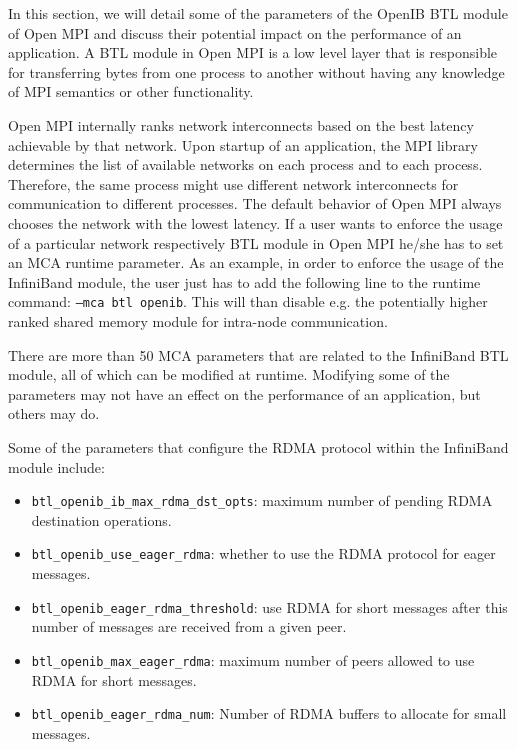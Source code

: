 In this section, we will detail some of the parameters of the OpenIB BTL module of Open MPI and discuss their potential impact on the performance of an application.  A BTL module in Open MPI is a low level layer that is responsible for transferring bytes from one process to another without having any knowledge of MPI semantics or other functionality. 

Open MPI internally ranks network interconnects based on the best latency achievable by that network. Upon startup of an application, the MPI library determines the list of available networks on each process and to each process. Therefore, the same process might use different network interconnects for communication to different processes. The default behavior of Open MPI always chooses the network with the lowest latency. If a user wants to enforce the usage of a particular network respectively BTL module in Open MPI he/she has to set an MCA runtime parameter. As an example, in order to enforce the usage of the InfiniBand module, the user just has to add the following line to the runtime command: 
{\tt --mca btl openib}. This will than disable e.g. the potentially higher ranked shared memory module for intra-node communication.

There are more than 50 MCA parameters that are related to the InfiniBand BTL
module, all of which can be modified at runtime. Modifying some of
the parameters may not have an effect on the performance of an application,
but others may do. 

Some of the parameters that configure the RDMA \cite{rdma} protocol within the InfiniBand module 
include:
\begin{itemize}
\item {\tt btl\_openib\_ib\_max\_rdma\_dst\_opts}: maximum number of pending
  RDMA destination operations.
\item {\tt btl\_openib\_use\_eager\_rdma}: whether to use the RDMA protocol for
  eager messages.
\item {\tt btl\_openib\_eager\_rdma\_threshold}: use RDMA for short messages
  after this number of messages are received from a given peer.
\item {\tt btl\_openib\_max\_eager\_rdma}: maximum number of peers allowed to
  use RDMA for short messages.
\item {\tt btl\_openib\_eager\_rdma\_num}: Number of RDMA buffers to allocate
  for small messages.
\end{itemize}

